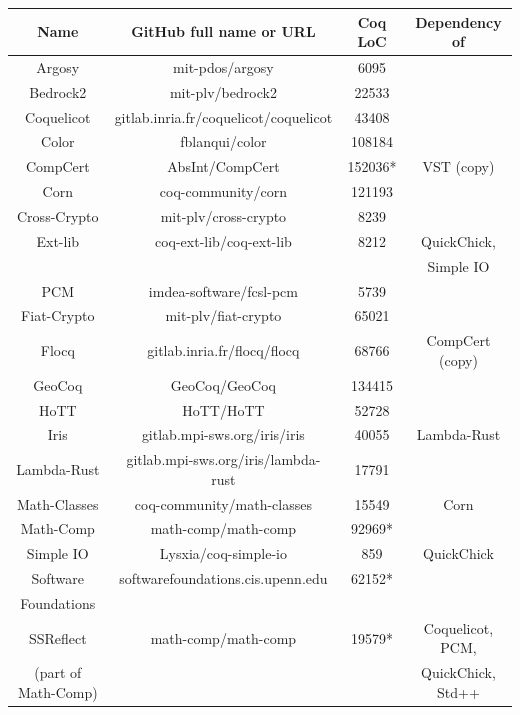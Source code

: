 \begin{table}
	\begin{center}
		\begin{tabular}{|c|c|c|c|}
			\hline
			\textbf{Name} & \textbf{GitHub full name or URL} & \textbf{Coq LoC} & \textbf{Dependency of} \\
			\hline
			Argosy & mit-pdos/argosy & 6095 & \\
			\hline
			Bedrock2 & mit-plv/bedrock2 & 22533 & \\
			\hline
			Coquelicot & gitlab.inria.fr/coquelicot/coquelicot & 43408 & \\
			\hline
			Color & fblanqui/color & 108184 & \\
			\hline
			CompCert & AbsInt/CompCert & 152036* & VST (copy) \\
			\hline
			Corn & coq-community/corn & 121193 & \\
			\hline
			Cross-Crypto & mit-plv/cross-crypto & 8239 & \\
			\hline
			Ext-lib & coq-ext-lib/coq-ext-lib & 8212 & QuickChick,\\
			& & & Simple IO \\
			\hline
			PCM & imdea-software/fcsl-pcm & 5739 & \\
			\hline
			Fiat-Crypto & mit-plv/fiat-crypto & 65021 & \\
			\hline
			Flocq & gitlab.inria.fr/flocq/flocq & 68766 & CompCert (copy) \\
			\hline
			GeoCoq & GeoCoq/GeoCoq & 134415 & \\
			\hline
			HoTT & HoTT/HoTT & 52728 & \\
			\hline
			Iris & gitlab.mpi-sws.org/iris/iris & 40055 & Lambda-Rust \\
			\hline
			Lambda-Rust & gitlab.mpi-sws.org/iris/lambda-rust & 17791 & \\
			\hline
			Math-Classes & coq-community/math-classes & 15549 & Corn \\
			\hline
			Math-Comp & math-comp/math-comp & 92969* & \\
			\hline
			Simple IO & Lysxia/coq-simple-io & 859 & QuickChick \\
			\hline
			Software & softwarefoundations.cis.upenn.edu & 62152* & \\
			Foundations & & & \\
			\hline
			SSReflect & math-comp/math-comp & 19579* & Coquelicot, PCM, \\
			(part of Math-Comp) & & & QuickChick, Std++ \\

\end{tabular}
\end{center}
\end{table}
